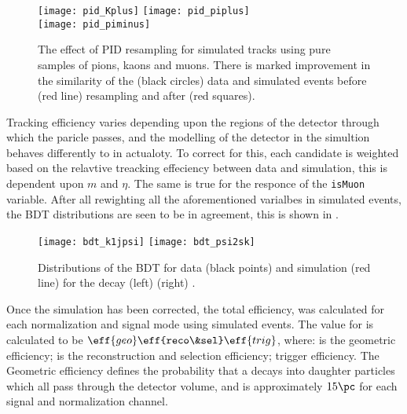\begin{figure}
  \begin{center}
    \texttt{[image: pid\_Kplus]}
    \texttt{[image: pid\_piplus]}\\
    \texttt{[image: pid\_piminus]}
    \caption[Effect of resampling PID variables in simulation]
    {\small
      The effect of PID resampling for simulated tracks using pure samples of pions, kaons and
      muons.
      There is marked improvement in the similarity of the (black circles) \btojpsikpipi data and
      simulated events before (red line) resampling and after (red squares).
    }
    \label{fig:hhh:pid}
  \end{center}
\end{figure}


Tracking efficiency varies depending upon the regions of the detector through which the paricle
passes, and the modelling of the detector in the simultion behaves differently to in actualoty.
To correct for this, each candidate is weighted based on the relavtive treacking effeciency between
data and simulation, this is dependent upon $m$ and $\eta$.
The same is true for the responce of the {\tt isMuon} variable.
After all rewighting all the aforementioned varialbes in simulated events, the BDT distributions
are seen to be in agreement, this is shown in .

\begin{figure}
  \begin{center}
    \texttt{[image: bdt\_k1jpsi]}
    \texttt{[image: bdt\_psi2sk]}
    \caption[BDT distributions in data and simulation]
    {\small
      Distributions of the BDT for data (black points) and simulation (red line) for the decay
      (left) 
      (right) \btopsitwosk.
    }
    \label{fig:kpipi:bdt}
  \end{center}
\end{figure}

Once the simulation has been corrected, the total efficiency,  was calculated for each
normalization and signal mode using simulated events.
The value for  is calculated to be $\eff{geo}\eff{reco\&sel}\eff{trig}$, where:
 is the geometric efficiency;
 is the reconstruction and selection efficiency;
 trigger efficiency.
The Geometric efficiency defines the probability that a \Bp decays into daughter particles which
all pass through the \lhcb detector volume, and is approximately $15\pc$ for each signal and
normalization channel.

